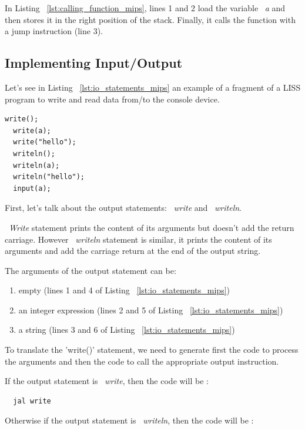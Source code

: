 \documentclass[
  oneside,
  11pt, a4paper,
  footinclude=true,
  headinclude=true,
  cleardoublepage=empty
]{scrbook}
\begin{document}
In Listing ~\ref{lst:calling_function_mips}, lines 1 and 2 load the variable ~\textit{a} and then stores it in the right position of the stack. Finally, it calls the function with a jump instruction (line 3).



\subsection{Implementing Input/Output}

Let's see in Listing ~\ref{lst:io_statements_mips} an example of a fragment of a LISS program to write and read data from/to the console device.

\begin{lstlisting}[caption={Example of I/O statements in LISS},label={lst:io_statements_mips}]
  write();
  write(a);
  write("hello");
  writeln();
  writeln(a);
  writeln("hello");
  input(a);
\end{lstlisting}

First, let's talk about the output statements: ~\textit{write} and ~\textit{writeln}.

~\textit{Write} statement prints the content of its arguments but doesn't add the return carriage. However ~\textit{writeln} statement is similar, it prints the content of its arguments and add the carriage return at the end of the output string.

The arguments of the output statement can be:

\begin{enumerate}
\item empty (lines 1 and 4 of Listing ~\ref{lst:io_statements_mips})
\item an integer expression (lines 2 and 5 of Listing ~\ref{lst:io_statements_mips})
\item a string (lines 3 and 6 of Listing ~\ref{lst:io_statements_mips})
\end{enumerate}

To translate the 'write()' statement, we need to generate first the code to process the arguments and then the code to call the appropriate output instruction.

If the output statement is ~\textit{write}, then the code will be :

\begin{lstlisting}
  jal write
\end{lstlisting}

Otherwise if the output statement is ~\textit{writeln}, then the code will be :
\end{document}
